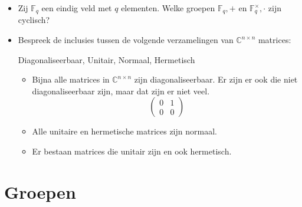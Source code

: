 \documentclass[main.tex]{subfiles}
\begin{document}
\begin{itemize}
\item Zij $\mathbb{F}_{q}$ een eindig veld met $q$ elementen.
  Welke groepen $\mathbb{F}_{q},+$ en $\mathbb{F}_{q}^{\times},\cdot$ zijn cyclisch?
\item Bespreek de inclusies tussen de volgende verzamelingen van $\mathbb{C}^{n \times n}$ matrices:
  \begin{center}
    Diagonaliseerbaar, Unitair, Normaal, Hermetisch
  \end{center}
  \begin{itemize}
  \item 
    Bijna alle matrices in $\mathbb{C}^{n\times n}$ zijn diagonaliseerbaar.
    Er zijn er ook die niet diagonaliseerbaar zijn, maar dat zijn er niet veel.
    \[
    \begin{pmatrix}
      0 & 1\\
      0 & 0
    \end{pmatrix}
    \]
  \item Alle unitaire en hermetische matrices zijn normaal.
  \item Er bestaan matrices die unitair zijn en ook hermetisch. 
  \end{itemize}
\end{itemize}

\section{Groepen}
\label{sec:groepen}
\end{document}
